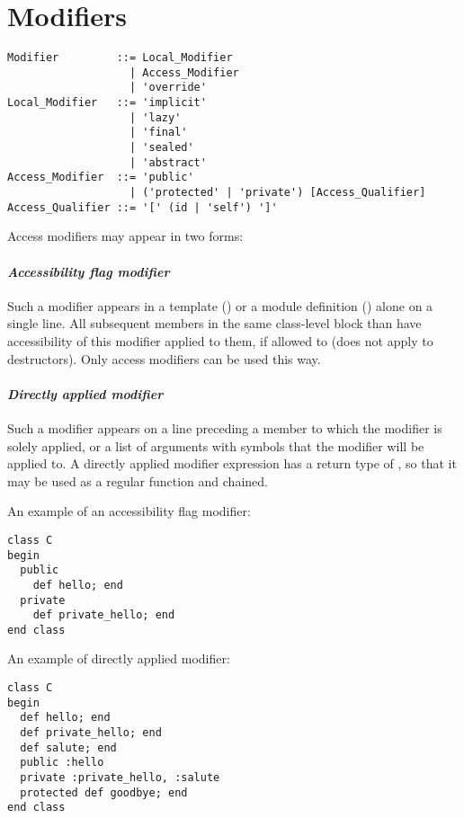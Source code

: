 \section{Modifiers}
\label{sec:modifiers}

\syntax\begin{lstlisting}
Modifier         ::= Local_Modifier
                   | Access_Modifier
                   | 'override'
Local_Modifier   ::= 'implicit'
                   | 'lazy'
                   | 'final'
                   | 'sealed'
                   | 'abstract'
Access_Modifier  ::= 'public'
                   | ('protected' | 'private') [Access_Qualifier]
Access_Qualifier ::= '[' (id | 'self') ']'
\end{lstlisting}

Access modifiers may appear in two forms:

\paragraph{\em Accessibility flag modifier}
Such a modifier appears in a template () or a module definition () alone on a single line. All subsequent members in the same class-level block than have accessibility of this modifier applied to them, if allowed to (does not apply to destructors). Only access modifiers can be used this way. 

\paragraph{\em Directly applied modifier}
Such a modifier appears on a line preceding a member to which the modifier is solely applied, or a list of arguments with symbols that the modifier will be applied to. A directly applied modifier expression has a return type of , so that it may be used as a regular function and chained. 

\example An example of an accessibility flag modifier:
\begin{lstlisting}
class C
begin
  public
    def hello; end
  private
    def private_hello; end
end class
\end{lstlisting}

\example An example of directly applied modifier:
\begin{lstlisting}
class C
begin
  def hello; end
  def private_hello; end
  def salute; end
  public :hello
  private :private_hello, :salute
  protected def goodbye; end
end class
\end{lstlisting}

